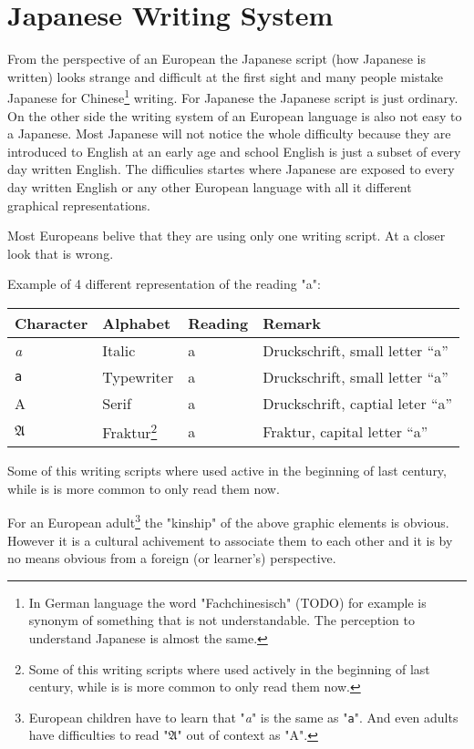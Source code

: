 \chapter{Japanese Writing System}

From the perspective of an European the Japanese script (how Japanese is
written) looks strange and difficult at the first sight and many people mistake
Japanese for Chinese\footnote{In German language the word "Fachchinesisch"
(TODO) for example is synonym of something that is not understandable. The
perception to understand Japanese is almost the same.} writing.  For Japanese
the Japanese script is just ordinary. On the other side the writing system of
an European language is also not easy to a Japanese. Most Japanese will not
notice the whole difficulty because they are introduced to English at an early
age and school English is just a subset of every day written English. The
difficulies startes where Japanese are exposed to every day written English or
any other European language with all it different graphical representations.

Most Europeans belive that they are using only one writing script. At a closer
look that is wrong.

\bigskip Example of 4 different representation of the reading "a":

\begin{center}
\begin{tabular}{|l|l|l|l|}
\textbf{Character}&\textbf{Alphabet}&\textbf{Reading}&\textbf{Remark}\\\hline
\textit{a}     &  Italic        & a & Druckschrift, small letter ``a'' \\ 
\texttt{a}     &  Typewriter    & a & Druckschrift, small letter ``a'' \\ 
A              &  Serif         & a & Druckschrift, captial leter ``a'' \\ 
$\mathfrak{A}$ & Fraktur\footnote{Some of this writing scripts where used actively in the beginning of last
century, while is is more common to only read them now.}& a & Fraktur, capital letter ``a''  \\ 
\end{tabular}
\end{center}

Some of this writing scripts where used active in the beginning of last
century, while is is more common to only read them now. 

For an European adult\footnote{European children have to learn that
"\textit{a}" is the same as "\texttt{a}". And even adults have difficulties to
read "$\mathfrak{A}$" out of context as "A".}  the "kinship" of the above
graphic elements is obvious. However it is a cultural achivement to associate
them to each other and it is by no means obvious from a foreign (or learner's)
perspective. 

